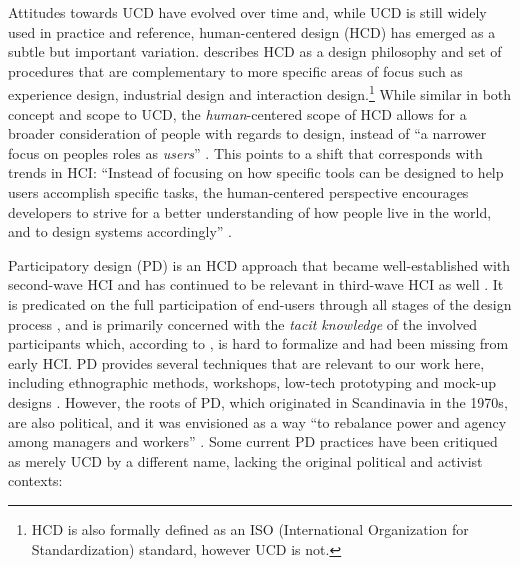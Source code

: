 \documentclass[letterpaper, 12pt]{article}
\begin{document}
Attitudes towards UCD have evolved over time and, while UCD is still widely used in practice and reference, human-centered design (HCD) has emerged as a subtle but important variation. \citet{Norman2013} describes HCD as a design philosophy and set of procedures that are complementary to more specific areas of focus such as experience design, industrial design and interaction design.\footnote{HCD is also formally defined as an ISO (International Organization for Standardization) standard, however UCD is not.} 
While similar in both concept and scope to UCD, the \emph{human}-centered scope of HCD allows for a broader consideration of people with regards to design, instead of ``a narrower focus on peoples roles as \emph{users}'' \citep[p. 45]{Steen2011}. This points to a shift that corresponds with trends in HCI: ``Instead of focusing on how specific tools can be designed to help users accomplish specific tasks, the human-centered perspective encourages developers to strive for a better understanding of how people live in the world, and to design systems accordingly'' \citep[p. 45]{El-shimy2014}. 

Participatory design (PD) is an HCD approach that became well-established with second-wave HCI \citep{Bodker2015} and has continued to be relevant in third-wave HCI as well \citep{Muller2012}. It is predicated on the full participation of end-users through all stages of the design process \citep{Steen2011}, and is primarily concerned with the \emph{tacit knowledge} of the involved participants which, according to \citet{Spinuzzi2005}, is hard to formalize and had been missing from early HCI. PD provides several techniques that are relevant to our work here, including ethnographic methods, workshops, low-tech prototyping and mock-up designs \citep{Muller1993a}. However, the roots of PD, which originated in Scandinavia in the 1970s, are also political, and it was envisioned as a way ``to rebalance power and agency among managers and workers'' \citep[p. 1]{Bannon2018}. Some current PD practices have been critiqued as merely UCD by a different name, lacking the original political and activist contexts: 
\end{document}
